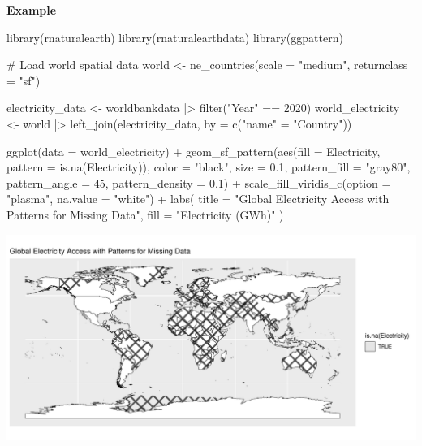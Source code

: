 \documentclass[
  letterpaper,
  DIV=11,
  numbers=noendperiod]{scrreprt}
\newenvironment{Shaded}{\begin{snugshade}}{\end{snugshade}}
\newcommand{\AttributeTok}[1]{\textcolor[rgb]{0.40,0.45,0.13}{#1}}
\newcommand{\CommentTok}[1]{\textcolor[rgb]{0.37,0.37,0.37}{#1}}
\newcommand{\DecValTok}[1]{\textcolor[rgb]{0.68,0.00,0.00}{#1}}
\newcommand{\FloatTok}[1]{\textcolor[rgb]{0.68,0.00,0.00}{#1}}
\newcommand{\FunctionTok}[1]{\textcolor[rgb]{0.28,0.35,0.67}{#1}}
\newcommand{\NormalTok}[1]{\textcolor[rgb]{0.00,0.23,0.31}{#1}}
\newcommand{\OtherTok}[1]{\textcolor[rgb]{0.00,0.23,0.31}{#1}}
\newcommand{\SpecialCharTok}[1]{\textcolor[rgb]{0.37,0.37,0.37}{#1}}
\newcommand{\StringTok}[1]{\textcolor[rgb]{0.13,0.47,0.30}{#1}}
\begin{document}
\textbf{Example}

\begin{Shaded}
\begin{Highlighting}[]
\FunctionTok{library}\NormalTok{(rnaturalearth)}
\FunctionTok{library}\NormalTok{(rnaturalearthdata)}
\FunctionTok{library}\NormalTok{(ggpattern)}

\CommentTok{\# Load world spatial data}
\NormalTok{world }\OtherTok{\textless{}{-}} \FunctionTok{ne\_countries}\NormalTok{(}\AttributeTok{scale =} \StringTok{"medium"}\NormalTok{, }\AttributeTok{returnclass =} \StringTok{"sf"}\NormalTok{)}

\NormalTok{electricity\_data }\OtherTok{\textless{}{-}}\NormalTok{ worldbankdata }\SpecialCharTok{|\textgreater{}} \FunctionTok{filter}\NormalTok{(}\StringTok{"Year"} \SpecialCharTok{==} \DecValTok{2020}\NormalTok{)}
\NormalTok{world\_electricity }\OtherTok{\textless{}{-}}\NormalTok{ world }\SpecialCharTok{|\textgreater{}} 
  \FunctionTok{left\_join}\NormalTok{(electricity\_data, }\AttributeTok{by =} \FunctionTok{c}\NormalTok{(}\StringTok{"name"} \OtherTok{=} \StringTok{"Country"}\NormalTok{))}

\FunctionTok{ggplot}\NormalTok{(}\AttributeTok{data =}\NormalTok{ world\_electricity) }\SpecialCharTok{+}
  \FunctionTok{geom\_sf\_pattern}\NormalTok{(}\FunctionTok{aes}\NormalTok{(}\AttributeTok{fill =}\NormalTok{ Electricity, }\AttributeTok{pattern =} \FunctionTok{is.na}\NormalTok{(Electricity)), }
                  \AttributeTok{color =} \StringTok{"black"}\NormalTok{, }
                  \AttributeTok{size =} \FloatTok{0.1}\NormalTok{,}
                  \AttributeTok{pattern\_fill =} \StringTok{"gray80"}\NormalTok{, }
                  \AttributeTok{pattern\_angle =} \DecValTok{45}\NormalTok{, }
                  \AttributeTok{pattern\_density =} \FloatTok{0.1}\NormalTok{) }\SpecialCharTok{+}
  \FunctionTok{scale\_fill\_viridis\_c}\NormalTok{(}\AttributeTok{option =} \StringTok{"plasma"}\NormalTok{, }\AttributeTok{na.value =} \StringTok{"white"}\NormalTok{) }\SpecialCharTok{+}
  \FunctionTok{labs}\NormalTok{(}
    \AttributeTok{title =} \StringTok{"Global Electricity Access with Patterns for Missing Data"}\NormalTok{,}
    \AttributeTok{fill =} \StringTok{"Electricity (GWh)"}
\NormalTok{  )}
\end{Highlighting}
\end{Shaded}

\includegraphics{s_files/figure-pdf/unnamed-chunk-12-1.pdf}
\end{document}
